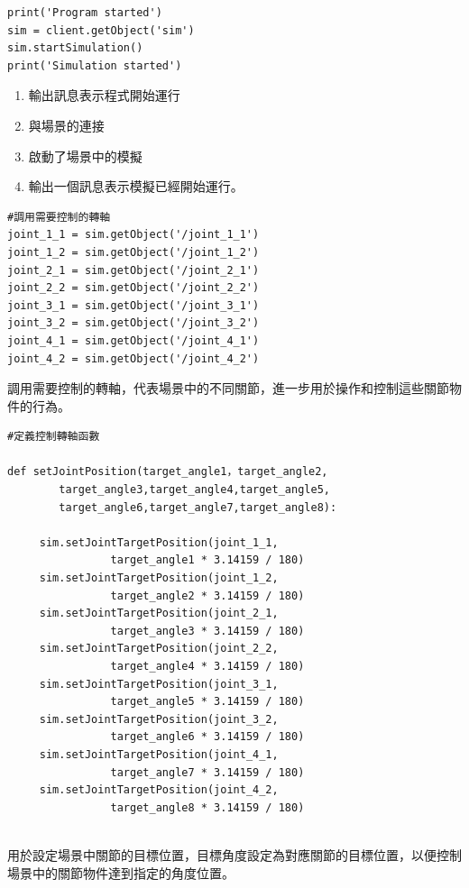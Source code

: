 \label{啟動模擬}
\begin{lstlisting}[caption=\Large 啟動模擬]
print('Program started')
sim = client.getObject('sim')
sim.startSimulation()
print('Simulation started')
\end{lstlisting}
\begin{enumerate}
\item 輸出訊息表示程式開始運行
\item 與場景的連接
\item 啟動了場景中的模擬
\item 輸出一個訊息表示模擬已經開始運行。
\end{enumerate}

\label{轉軸設定}
\begin{lstlisting}[caption=\Large 轉軸設定]
#調用需要控制的轉軸
joint_1_1 = sim.getObject('/joint_1_1')
joint_1_2 = sim.getObject('/joint_1_2')
joint_2_1 = sim.getObject('/joint_2_1')
joint_2_2 = sim.getObject('/joint_2_2')
joint_3_1 = sim.getObject('/joint_3_1')
joint_3_2 = sim.getObject('/joint_3_2')
joint_4_1 = sim.getObject('/joint_4_1')
joint_4_2 = sim.getObject('/joint_4_2')
\end{lstlisting}  

調用需要控制的轉軸，代表場景中的不同關節，進一步用於操作和控制這些關節物件的行為。\\

\label{轉軸函數}
\begin{lstlisting}[caption=\Large 轉軸函數]
#定義控制轉軸函數 

def setJointPosition(target_angle1，target_angle2,
        target_angle3,target_angle4,target_angle5,
        target_angle6,target_angle7,target_angle8):

     sim.setJointTargetPosition(joint_1_1,
                target_angle1 * 3.14159 / 180)
     sim.setJointTargetPosition(joint_1_2,
                target_angle2 * 3.14159 / 180)
     sim.setJointTargetPosition(joint_2_1,
                target_angle3 * 3.14159 / 180)
     sim.setJointTargetPosition(joint_2_2,
                target_angle4 * 3.14159 / 180)
     sim.setJointTargetPosition(joint_3_1,
                target_angle5 * 3.14159 / 180)
     sim.setJointTargetPosition(joint_3_2,
                target_angle6 * 3.14159 / 180)
     sim.setJointTargetPosition(joint_4_1,
                target_angle7 * 3.14159 / 180)
     sim.setJointTargetPosition(joint_4_2,
                target_angle8 * 3.14159 / 180)
     
\end{lstlisting}
用於設定場景中關節的目標位置，目標角度設定為對應關節的目標位置，以便控制場景中的關節物件達到指定的角度位置。\\
\newpage


